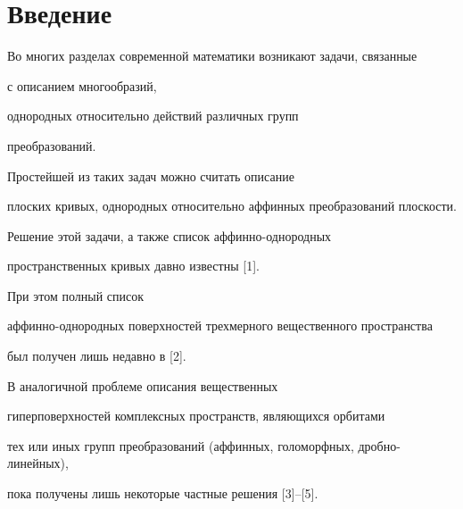 \date{}




\pagestyle{plain} %







\maketitle


\label{begin}








\section*{Введение}





Во многих разделах современной математики возникают задачи, связанные 


с описанием многообразий, 


однородных относительно действий различных групп 


преобразований. 


Простейшей из таких задач можно считать описание 


плоских кривых, однородных относительно аффинных преобразований плоскости.


Решение этой задачи, а также список аффинно-однородных


пространственных кривых давно известны [1]. 


При этом полный список 


аффинно-однородных поверхностей трехмерного вещественного пространства 


был получен лишь недавно в [2].





В аналогичной проблеме описания вещественных


гиперповерхностей комплексных прост\-ранств, являющихся орбитами


тех или иных групп преобразований (аффинных, голоморфных, дробно-линейных),


пока получены лишь некоторые частные решения [3]--[5]. 





